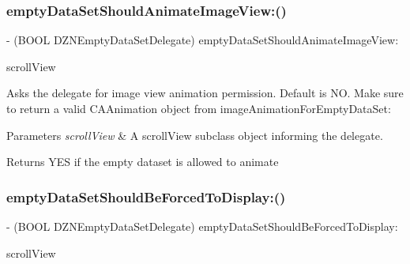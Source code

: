 \subsubsection{\texorpdfstring{empty\+Data\+Set\+Should\+Animate\+Image\+View\+:()}{emptyDataSetShouldAnimateImageView:()}}
{\footnotesize\ttfamily -\/ (B\+O\+OL D\+Z\+N\+Empty\+Data\+Set\+Delegate) empty\+Data\+Set\+Should\+Animate\+Image\+View\+: \begin{DoxyParamCaption}\item[{(U\+I\+Scroll\+View $\ast$)}]{scroll\+View }\end{DoxyParamCaption}\hspace{0.3cm}{\ttfamily [optional]}}

Asks the delegate for image view animation permission. Default is NO. Make sure to return a valid C\+A\+Animation object from image\+Animation\+For\+Empty\+Data\+Set\+:


\begin{DoxyParams}{Parameters}
{\em scroll\+View} & A scroll\+View subclass object informing the delegate. \\
\hline
\end{DoxyParams}
\begin{DoxyReturn}{Returns}
Y\+ES if the empty dataset is allowed to animate 
\end{DoxyReturn}
\mbox{\label{protocol_d_z_n_empty_data_set_delegate_01-p_a21fcd9ef6820b256738e4c10540911fc}} 
\subsubsection{\texorpdfstring{empty\+Data\+Set\+Should\+Be\+Forced\+To\+Display\+:()}{emptyDataSetShouldBeForcedToDisplay:()}}
{\footnotesize\ttfamily -\/ (B\+O\+OL D\+Z\+N\+Empty\+Data\+Set\+Delegate) empty\+Data\+Set\+Should\+Be\+Forced\+To\+Display\+: \begin{DoxyParamCaption}\item[{(U\+I\+Scroll\+View $\ast$)}]{scroll\+View }\end{DoxyParamCaption}\hspace{0.3cm}{\ttfamily [optional]}}

